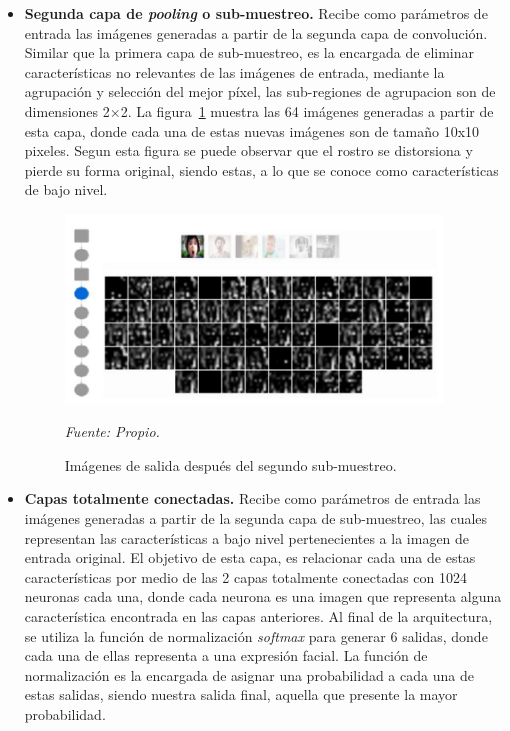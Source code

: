 \begin{itemize}
\item
{
\textbf{Segunda capa de \textit{pooling} o sub-muestreo.} Recibe como parámetros de entrada las imágenes generadas a partir de la segunda capa de convolución. Similar que la primera capa de sub-muestreo, es la encargada de eliminar características no relevantes de las imágenes de entrada, mediante la agrupación y selección del mejor píxel, las sub-regiones de agrupacion son de dimensiones 2$\times$2. La figura~\ref{fig:filtro4} muestra las 64 imágenes generadas a partir de esta capa, donde cada una de estas nuevas imágenes son de tamaño 10x10 pixeles. Segun esta figura se puede observar que el rostro se distorsiona y pierde su forma original, siendo estas, a lo que se conoce como características de bajo nivel.
\begin{figure}[H]
		\centering
		\includegraphics[width=100mm]{Imagenes/filtro4.png}
		\caption{Imágenes de salida después del segundo sub-muestreo.}
		\vspace{0.15cm}
		\textit{Fuente: Propio.}
		\label{fig:filtro4}
\end{figure}
}
\item
{
\textbf{Capas totalmente conectadas.} Recibe como parámetros de entrada las imágenes generadas a partir de la segunda capa de sub-muestreo, las cuales representan las características a bajo nivel pertenecientes a la imagen de entrada original. El objetivo de esta capa, es relacionar cada una de estas características por medio de las 2 capas totalmente conectadas con 1024 neuronas cada una, donde cada neurona es una imagen que representa alguna característica encontrada en las capas anteriores. Al final de la arquitectura, se utiliza la función de normalización \textit{softmax} para generar 6 salidas, donde cada una de ellas representa a una expresión facial. La función de normalización es la encargada de asignar una probabilidad a cada una de estas salidas, siendo nuestra salida final, aquella que presente la mayor probabilidad.
}
\end{itemize}

